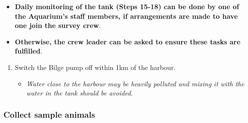 \documentclass[
  letterpaper,
  DIV=11,
  numbers=noendperiod]{scrreprt}
\providecommand{\tightlist}{%
  \setlength{\itemsep}{0pt}\setlength{\parskip}{0pt}}\usepackage{longtable,booktabs,array}
\begin{document}
\begin{itemize}
\tightlist
\item
  \textbf{Daily monitoring of the tank (Steps 15-18) can be done by one
  of the Aquarium's staff members, if arrangements are made to have one
  join the survey crew}.
\item
  \textbf{Otherwise, the crew leader can be asked to ensure these tasks
  are fulfilled}.
\end{itemize}

\begin{enumerate}
\def\labelenumi{\arabic{enumi}.}
\setcounter{enumi}{18}
\tightlist
\item
  Switch the Bilge pump off within 1km of the harbour.

  \begin{itemize}
  \tightlist
  \item
    \emph{Water close to the harbour may be heavily polluted and mixing
    it with the water in the tank should be avoided}.
  \end{itemize}
\end{enumerate}

\hypertarget{collect-sample-animals}{%
\subsubsection{Collect sample animals}\label{collect-sample-animals}}
\end{document}

